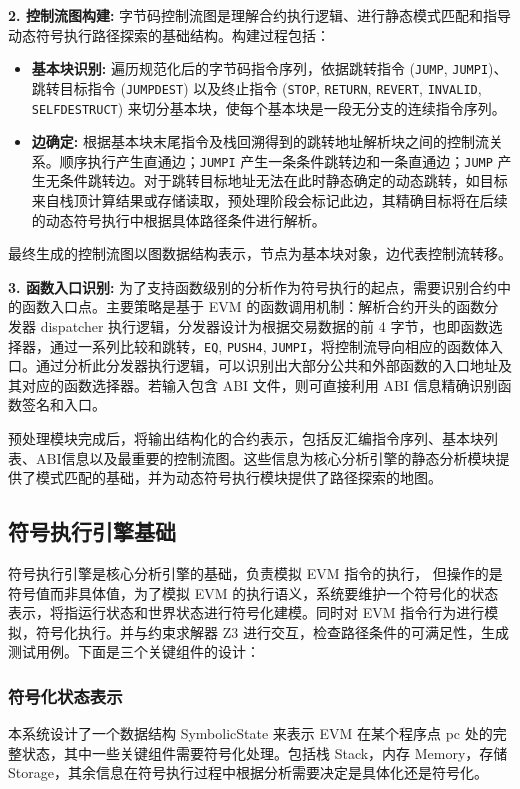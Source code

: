 \documentclass[print, master, vlined, timesmath]{DissertUESTC}
\begin{document}
\textbf{2. 控制流图构建:}
字节码控制流图是理解合约执行逻辑、进行静态模式匹配和指导动态符号执行路径探索的基础结构。构建过程包括：
\begin{itemize}
    \item \textbf{基本块识别:} 遍历规范化后的字节码指令序列，依据跳转指令 (\texttt{JUMP}, \texttt{JUMPI})、跳转目标指令 (\texttt{JUMPDEST}) 以及终止指令 (\texttt{STOP}, \texttt{RETURN}, \texttt{REVERT}, \texttt{INVALID}, \texttt{SELFDESTRUCT}) 来切分基本块，使每个基本块是一段无分支的连续指令序列。
    \item \textbf{边确定:} 根据基本块末尾指令及栈回溯得到的跳转地址解析块之间的控制流关系。顺序执行产生直通边；\texttt{JUMPI} 产生一条条件跳转边和一条直通边；\texttt{JUMP} 产生无条件跳转边。对于跳转目标地址无法在此时静态确定的动态跳转，如目标来自栈顶计算结果或存储读取，预处理阶段会标记此边，其精确目标将在后续的动态符号执行中根据具体路径条件进行解析。
\end{itemize}
最终生成的控制流图以图数据结构表示，节点为基本块对象，边代表控制流转移。

\textbf{3. 函数入口识别:}
为了支持函数级别的分析作为符号执行的起点，需要识别合约中的函数入口点。主要策略是基于 EVM 的函数调用机制：解析合约开头的函数分发器 dispatcher 执行逻辑，分发器设计为根据交易数据的前 4 字节，也即函数选择器，通过一系列比较和跳转，\texttt{EQ}, \texttt{PUSH4}, \texttt{JUMPI}，将控制流导向相应的函数体入口。通过分析此分发器执行逻辑，可以识别出大部分公共和外部函数的入口地址及其对应的函数选择器。若输入包含 ABI 文件，则可直接利用 ABI 信息精确识别函数签名和入口。

预处理模块完成后，将输出结构化的合约表示，包括反汇编指令序列、基本块列表、ABI信息以及最重要的控制流图。这些信息为核心分析引擎的静态分析模块提供了模式匹配的基础，并为动态符号执行模块提供了路径探索的地图。



\subsection{符号执行引擎基础}

符号执行引擎是核心分析引擎的基础，负责模拟 EVM 指令的执行，
但操作的是符号值而非具体值，为了模拟 EVM 的执行语义，系统要维护一个符号化的状态表示，将指运行状态和世界状态进行符号化建模。同时对 EVM 指令行为进行模拟，符号化执行。并与约束求解器 Z3 进行交互，检查路径条件的可满足性，生成测试用例。下面是三个关键组件的设计：

\subsubsection{符号化状态表示}
本系统设计了一个数据结构 SymbolicState 来表示 EVM 在某个程序点 pc 处的完整状态，其中一些关键组件需要符号化处理。包括栈 Stack，内存 Memory，存储 Storage，其余信息在符号执行过程中根据分析需要决定是具体化还是符号化。
\end{document}
